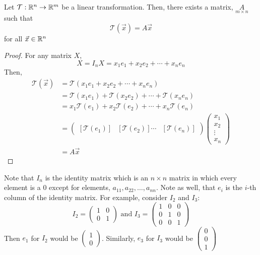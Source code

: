 \begin{thm}{}{}
    Let $\mathcal{T}: \mathbb R^{n} \to \mathbb R^{m}$ be a linear transformation. Then, there exists a matrix, $\underset{m \times n}{A}$ such that 
    \[\mathcal{T}\left(\vec{x}\right) = A\vec{x}\]
    for all $\vec{x}\in\mathbb R^{n}$
    \begin{proof}
        For any matrix $X$, 
        \[X = I_{n}X = x_{1}e_{1} + x_{2}e_{2} + \cdots + x_{n}e_{n}\]
        Then, 
        \begin{align*}
            \mathcal{T}(\vec{x}) &= \mathcal{T}\left(x_{1}e_{1} + x_{2}e_{2} + \cdots + x_{n}e_{n}\right) \\ 
            &= \mathcal{T}\left(x_{1}e_{1}\right) + \mathcal{T}\left(x_{2}e_{2}\right) + \cdots + \mathcal{T}\left(x_{n}e_{n}\right) \\ 
            &= x_1\mathcal{T}\left(e_1\right) + x_2\mathcal{T}\left(e_2\right) + \cdots + x_n\mathcal{T}\left(e_n\right) \\
            &= \begin{pmatrix}
                \left[\mathcal{T}\left(e_1\right)\right] & \left[\mathcal{T}\left(e_2\right)\right] \cdots & \left[\mathcal{T}\left(e_n\right)\right]
            \end{pmatrix}
            \begin{pmatrix}
                x_1 \\ x_2 \\ \vdots \\ x_n
            \end{pmatrix} \\
            &= A\vec{x}
        \end{align*}
    \end{proof}
\end{thm}
Note that $I_n$ is the identity matrix which is an $n \times n$ matrix in which every element is a $0$ except for elements, $a_{11}, a_{22}, \dots, a_{nn}$. Note as well, that $e_{i}$ is the $i$-th column of the identity matrix. For example, consider $I_2$ and $I_3$:
\[
    I_2 = \begin{pmatrix} 1 & 0 \\ 0 & 1\end{pmatrix} \text { and } I_3 = \begin{pmatrix} 1 & 0 & 0 \\ 0 & 1 & 0 \\ 0 & 0 & 1 \end{pmatrix}
\]
Then $e_1$ for $I_2$ would be $\begin{pmatrix} 1 \\ 0\end{pmatrix}$. Similarly, $e_3$ for $I_3$ would be $\begin{pmatrix} 0 \\ 0 \\ 1\end{pmatrix}$

